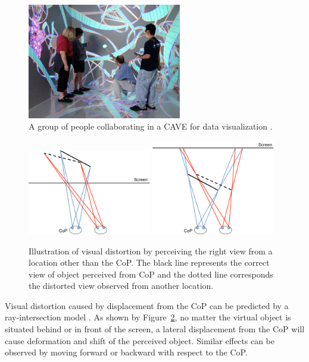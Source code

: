 \begin{figure}[htb]
  \centering
  \includegraphics[width=0.6\textwidth]{figures/ch2/group}
  \caption{\label{fig:2_group}A group of people collaborating in a CAVE for data visualization \citep{Pollock2012Right}.}
\end{figure}

\begin{figure}[htb]
  \centering
  \includegraphics[width=0.48\textwidth]{figures/ch2/distortion_1}
  \includegraphics[width=0.48\textwidth]{figures/ch2/distortion_2}
  \caption{\label{fig:2_ray_model}Illustration of visual distortion by perceiving the right view from a location other than the CoP. The black line represents the correct view of object perceived from CoP and the dotted line corresponds the distorted view observed from another location.}
\end{figure}


Visual distortion caused by displacement from the CoP can be predicted by a ray-intersection model \citep{Burton2012Diagnosing}. As shown by Figure~\ref{fig:2_ray_model}, no matter the virtual object is situated behind or in front of the screen, a lateral displacement from the CoP will cause deformation and shift of the perceived object. Similar effects can be observed by moving forward or backward with respect to the CoP.

